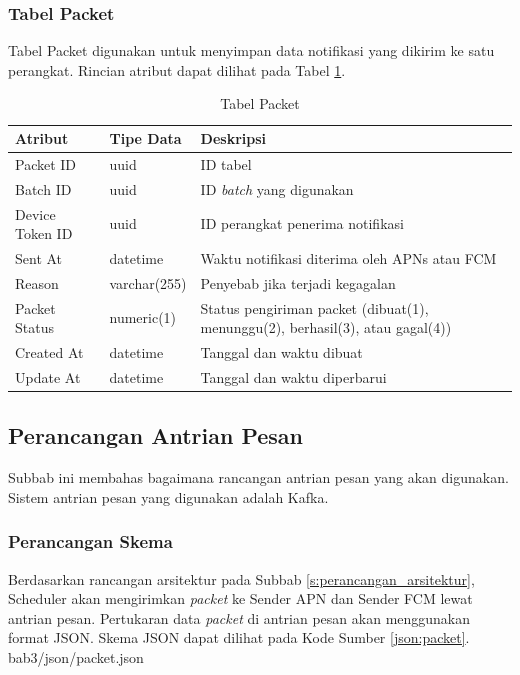 \subsubsection{Tabel Packet} \label{s:tabel_packet}
\par Tabel Packet digunakan untuk menyimpan data notifikasi yang dikirim ke satu perangkat. Rincian atribut dapat dilihat pada Tabel \ref{tabel_packet}.
\begin{longtable}{|p{2cm}|p{2.5cm}|p{4.5cm}|}
	\caption{Tabel Packet} \label{tabel_packet} \\ \hline
	{Atribut} & {Tipe Data} & {Deskripsi} \\ \hline
	Packet ID & uuid & ID tabel \\ \hline
	Batch ID & uuid & ID \textit{batch} yang digunakan \\ \hline
	Device Token ID & uuid & ID perangkat penerima notifikasi \\ \hline
	Sent At & datetime & Waktu notifikasi diterima oleh APNs atau FCM \\ \hline
	Reason & varchar(255) & Penyebab jika terjadi kegagalan \\ \hline
	Packet Status & numeric(1) & Status pengiriman packet (dibuat(1), menunggu(2), berhasil(3), atau gagal(4)) \\ \hline
	Created At & datetime & Tanggal dan waktu dibuat \\ \hline
	Update At & datetime & Tanggal dan waktu diperbarui \\ \hline
\end{longtable}

\subsection{Perancangan Antrian Pesan}
\par Subbab ini membahas bagaimana rancangan antrian pesan yang akan digunakan. Sistem antrian pesan yang digunakan adalah Kafka.

\subsubsection{Perancangan Skema}
\par Berdasarkan rancangan arsitektur pada Subbab \ref{s:perancangan_arsitektur}, Scheduler akan mengirimkan \textit{packet} ke Sender APN dan Sender FCM lewat antrian pesan. Pertukaran data \textit{packet} di antrian pesan akan menggunakan format JSON. Skema JSON dapat dilihat pada Kode Sumber \ref{json:packet}.
 {bab3/json/packet.json}

